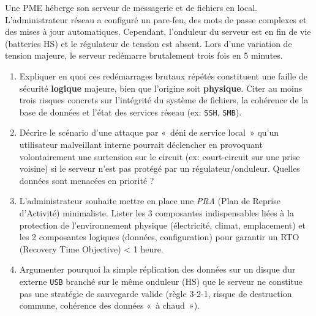 \documentclass[11pt]{article}
\begin{document}
\begin{exercice}
Une PME héberge son serveur de messagerie et de fichiers en local. L'administrateur réseau a configuré un pare-feu, des mots de passe complexes et des mises à jour automatiques. Cependant, l'onduleur du serveur est en fin de vie (batteries HS) et le régulateur de tension est absent. Lors d'une variation de tension majeure, le serveur redémarre brutalement trois fois en 5 minutes.
\begin{enumerate}
    \item Expliquer en quoi ces redémarrages brutaux répétés constituent une faille de sécurité \textbf{logique} majeure, bien que l'origine soit \textbf{physique}. Citer au moins trois risques concrets sur l'intégrité du système de fichiers, la cohérence de la base de données et l'état des services réseau (ex: \texttt{SSH}, \texttt{SMB}).
    \item Décrire le scénario d'une attaque par «~déni de service local~» qu'un utilisateur malveillant interne pourrait déclencher en provoquant volontairement une surtension sur le circuit (ex: court-circuit sur une prise voisine) si le serveur n'est pas protégé par un régulateur/onduleur. Quelles données sont menacées en priorité ?
    \item L'administrateur souhaite mettre en place une \textit{PRA} (Plan de Reprise d'Activité) minimaliste. Lister les 3 composantes indispensables liées à la protection de l'environnement physique (électricité, climat, emplacement) et les 2 composantes logiques (données, configuration) pour garantir un RTO (Recovery Time Objective) < 1 heure.
    \item Argumenter pourquoi la simple réplication des données sur un disque dur externe \texttt{USB} branché sur le même onduleur (HS) que le serveur ne constitue pas une stratégie de sauvegarde valide (règle 3-2-1, risque de destruction commune, cohérence des données «~à chaud~»).
\end{enumerate}
\end{exercice}
\end{document}
